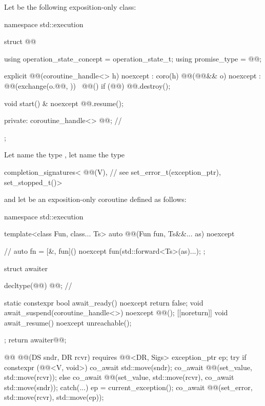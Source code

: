 \pnum
Let  be the following exposition-only class:
\begin{codeblock}
namespace std::execution {
  struct @@ {
    using operation_state_concept = operation_state_t;
    using promise_type = @@;

    explicit @@(coroutine_handle<> h) noexcept : coro(h) {}
    @@(@@&& o) noexcept
      : @@(exchange(o.@@, {})) {}
    ~@@() { if (@@) @@.destroy(); }

    void start() & noexcept {
      @@.resume();
    }

  private:
    coroutine_handle<> @@;                                    // \expos
  };
}
\end{codeblock}

\pnum
Let  name the type
,
let  name the type
\begin{codeblock}
completion_signatures<
  @@(V),         // see 
  set_error_t(exception_ptr),
  set_stopped_t()>
\end{codeblock}
and let  be an exposition-only coroutine
defined as follows:
\begin{codeblock}
namespace std::execution {
  template<class Fun, class... Ts>
  auto @@(Fun fun, Ts&&... as) noexcept {    // \expos
    auto fn = [&, fun]() noexcept { fun(std::forward<Ts>(as)...); };

    struct awaiter {
      decltype(@@) @@;                                     // \expos

      static constexpr bool await_ready() noexcept { return false; }
      void await_suspend(coroutine_handle<>) noexcept { @@(); }
      [[noreturn]] void await_resume() noexcept { unreachable(); }
    };
    return awaiter{@@};
  }

  @@ @@(DS sndr, DR rcvr) requires @@<DR, Sigs> {
    exception_ptr ep;
    try {
      if constexpr (@@<V, void>) {
        co_await std::move(sndr);
        co_await @@(set_value, std::move(rcvr));
      } else {
        co_await @@(set_value, std::move(rcvr), co_await std::move(sndr));
      }
    } catch(...) {
      ep = current_exception();
    }
    co_await @@(set_error, std::move(rcvr), std::move(ep));
  }
}
\end{codeblock}

